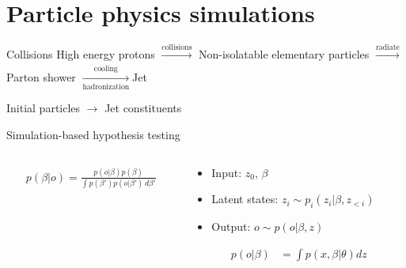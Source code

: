 \documentclass[aspectratio=169,xcolor=dvipsnames]{beamer}
\begin{document}
\begin{frame}[plain]
  \titlepage
\end{frame}

\begin{frame}[plain]
  \tableofcontents
\end{frame}

\section{Particle physics simulations}
\begin{frame}{Collisions}
  \centering
  High energy protons \pause $\xrightarrow[]{\text{collisions}}$ Non-isolatable elementary particles \pause $\xrightarrow[]{\text{radiate}}$ Parton shower \pause $\xrightarrow[\text{hadronization}]{\text{cooling}}$Jet

  \vspace{1.5cm}

  \pause Initial particles $\rightarrow$ Jet constituents
\end{frame}

\begin{frame}{Simulation-based hypothesis testing}
    \begin{columns}
   \pause
    \begin{column}{0.5\textwidth}
      \begin{align*}
        p(\beta | o) = \frac{p(o|\beta)p(\beta)}{\int p(\beta') p(o | \beta') \, d\beta'}\\
      \end{align*}
    \end{column}
    \pause
    \begin{column}{0.5\textwidth}
      \begin{itemize}
        \item Input: $z_0$, $\beta$
        \pause
        \item Latent states: $z_i \sim p_i (z_i | \beta, z_{<i})$
        \pause
        \item Output: $o \sim p(o | \beta, z)$
      \end{itemize}
      \pause
      \begin{align*}
          p(o | \beta) &= \int  p(x, \beta | \theta) dz
      \end{align*}
    \end{column}
   
  \end{columns}
  
  \end{frame}
\end{document}
